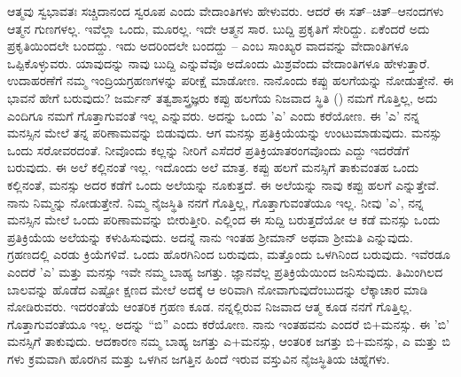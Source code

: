 ಆತ್ಮವು ಸ್ವಭಾವತಃ ಸಚ್ಚಿದಾನಂದ ಸ್ವರೂಪ ಎಂದು ವೇದಾಂತಿಗಳು ಹೇಳುವರು. ಆದರೆ ಈ ಸತ್–ಚಿತ್–ಆನಂದಗಳು ಆತ್ಮನ ಗುಣಗಳಲ್ಲ. ಇವೆಲ್ಲಾ ಒಂದು, ಮೂರಲ್ಲ. ಇದೇ ಆತ್ಮನ ಸಾರ. ಬುದ್ದಿ ಪ್ರಕೃತಿಗೆ ಸೇರಿದ್ದು. ಏಕೆಂದರೆ ಅದು ಪ್ರಕೃತಿಯಿಂದಲೇ ಬಂದದ್ದು. ಇದು ಅದರಿಂದಲೇ ಬಂದದ್ದು – ಎಂಬ ಸಾಂಖ್ಯರ ವಾದವನ್ನು ವೇದಾಂತಿಗಳೂ ಒಪ್ಪಿಕೊಳ್ಳುವರು. ಯಾವುದನ್ನು ನಾವು ಬುದ್ದಿ ಎನ್ನುವೆವೊ ಅದೊಂದು ಮಿಶ್ರವೆಂದು ವೇದಾಂತಿಗಳೂ ಹೇಳುತ್ತಾರೆ. ಉದಾಹರಣೆಗೆ ನಮ್ಮ ಇಂದ್ರಿಯಗ್ರಹಣಗಳನ್ನು ಪರೀಕ್ಷೆ ಮಾಡೋಣ. ನಾನೊಂದು ಕಪ್ಪು ಹಲಗೆಯನ್ನು ನೋಡುತ್ತೇನೆ. ಈ ಭಾವನೆ ಹೇಗೆ ಬರುವುದು? ಜರ್ಮನ್ ತತ್ವಶಾಸ್ತ್ರಜ್ಞರು ಕಪ್ಪು ಹಲಗೆಯ ನಿಜವಾದ ಸ್ಥಿತಿ () ನಮಗೆ ಗೊತ್ತಿಲ್ಲ, ಅದು ಎಂದಿಗೂ ನಮಗೆ ಗೊತ್ತಾಗುವಂತೆ ಇಲ್ಲ ಎನ್ನುವರು. ಅದನ್ನು ಒಂದು 'ಎ' ಎಂದು ಕರೆಯೋಣ. ಈ 'ಎ' ನನ್ನ ಮನಸ್ಸಿನ ಮೇಲೆ ತನ್ನ ಪರಿಣಾಮವನ್ನು ಬಿಡುವುದು. ಆಗ ಮನಸ್ಸು ಪ್ರತಿಕ್ರಿಯೆಯನ್ನು ಉಂಟುಮಾಡುವುದು. ಮನಸ್ಸು ಒಂದು ಸರೋವರದಂತೆ. ನೀವೊಂದು ಕಲ್ಲನ್ನು ನೀರಿಗೆ ಎಸೆದರೆ ಪ್ರತಿಕ್ರಿಯಾತರಂಗವೊಂದು ಎದ್ದು ಇದರೆಡೆಗೆ ಬರುವುದು. ಈ ಅಲೆ ಕಲ್ಲಿನಂತೆ ಇಲ್ಲ. ಇದೊಂದು ಅಲೆ ಮಾತ್ರ. ಕಪ್ಪು ಹಲಗೆ ಮನಸ್ಸಿಗೆ ತಾಕುವಂತಹ ಒಂದು ಕಲ್ಲಿನಂತೆ, ಮನಸ್ಸು ಅದರ ಕಡೆಗೆ ಒಂದು ಅಲೆಯನ್ನು ನೂಕುತ್ತದೆ. ಈ ಅಲೆಯನ್ನು ನಾವು ಕಪ್ಪು ಹಲಗೆ ಎನ್ನುತ್ತೇವೆ. ನಾನು ನಿಮ್ಮನ್ನು ನೋಡುತ್ತೇನೆ. ನಿಮ್ಮ ನೈಜಸ್ಥಿತಿ ನನಗೆ ಗೊತ್ತಿಲ್ಲ, ಗೊತ್ತಾಗುವಂತೆಯೂ ಇಲ್ಲ. ನೀವು 'ಎ', ನನ್ನ ಮನಸ್ಸಿನ ಮೇಲೆ ಒಂದು ಪರಿಣಾಮವನ್ನು ಬೀರುತ್ತೀರಿ. ಎಲ್ಲಿಂದ ಈ ಸುದ್ದಿ ಬರುತ್ತದೆಯೋ ಆ ಕಡೆ ಮನಸ್ಸು ಒಂದು ಪ್ರತಿಕ್ರಿಯೆಯ ಅಲೆಯನ್ನು ಕಳುಹಿಸುವುದು. ಅದನ್ನೆ ನಾನು ಇಂತಹ ಶ‍್ರೀಮಾನ್ ಅಥವಾ ಶ‍್ರೀಮತಿ ಎನ್ನುವುದು. ಗ್ರಹಣದಲ್ಲಿ ಎರಡು ಕ್ರಿಯೆಗಳಿವೆ. ಒಂದು ಹೊರಗಿನಿಂದ ಬರುವುದು, ಮತ್ತೊಂದು ಒಳಗಿನಿಂದ ಬರುವುದು. ಇವೆರಡೂ ಎಂದರೆ 'ಎ' ಮತ್ತು ಮನಸ್ಸು ಇವೇ ನಮ್ಮ ಬಾಹ್ಯ ಜಗತ್ತು. ಜ್ಞಾನವೆಲ್ಲ ಪ್ರತಿಕ್ರಿಯೆಯಿಂದ ಜನಿಸುವುದು. ತಿಮಿಂಗಿಲದ ಬಾಲವನ್ನು ಹೊಡೆದ ಎಷ್ಟೋ ಕ್ಷಣದ ಮೇಲೆ ಅದಕ್ಕೆ ಆ ಅರಿವಾಗಿ ನೋವಾಗುವುದೆಂಬುದನ್ನು ಲೆಕ್ಕಾಚಾರ ಮಾಡಿ ನೋಡಿರುವರು. ಇದರಂತೆಯೆ ಆಂತರಿಕ ಗ್ರಹಣ ಕೂಡ. ನನ್ನಲ್ಲಿರುವ ನಿಜವಾದ ಆತ್ಮ ಕೂಡ ನನಗೆ ಗೊತ್ತಿಲ್ಲ. ಗೊತ್ತಾಗುವಂತೆಯೂ ಇಲ್ಲ. ಅದನ್ನು “ಬಿ” ಎಂದು ಕರೆಯೋಣ. ನಾನು ಇಂತಹವನು ಎಂದರೆ ಬಿ+ಮನಸ್ಸು. ಈ 'ಬಿ' ಮನಸ್ಸಿಗೆ ತಾಕುವುದು. ಆದಕಾರಣ ನಮ್ಮ ಬಾಹ್ಯ ಜಗತ್ತು ಎ+ಮನಸ್ಸು, ಆಂತರಿಕ ಜಗತ್ತು ಬಿ+ಮನಸ್ಸು, ಎ ಮತ್ತು ಬಿ ಗಳು ಕ್ರಮವಾಗಿ ಹೊರಗಿನ ಮತ್ತು ಒಳಗಿನ ಜಗತ್ತಿನ ಹಿಂದೆ ಇರುವ ವಸ್ತುವಿನ ನೈಜಸ್ಥಿತಿಯ ಚಿಹ್ನೆಗಳು.

